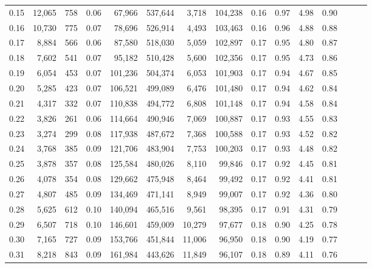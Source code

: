 \begin{tabular}{rrrrrrrrrrrrrrr}
0.15 &  12,065 &    758 &  0.06 &   67,966 &  537,644 &    3,718 &  104,238 &  0.16 &  0.97 &  4.98 &      0.90 \\
0.16 &  10,730 &    775 &  0.07 &   78,696 &  526,914 &    4,493 &  103,463 &  0.16 &  0.96 &  4.88 &      0.88 \\
0.17 &   8,884 &    566 &  0.06 &   87,580 &  518,030 &    5,059 &  102,897 &  0.17 &  0.95 &  4.80 &      0.87 \\
0.18 &   7,602 &    541 &  0.07 &   95,182 &  510,428 &    5,600 &  102,356 &  0.17 &  0.95 &  4.73 &      0.86 \\
0.19 &   6,054 &    453 &  0.07 &  101,236 &  504,374 &    6,053 &  101,903 &  0.17 &  0.94 &  4.67 &      0.85 \\
0.20 &   5,285 &    423 &  0.07 &  106,521 &  499,089 &    6,476 &  101,480 &  0.17 &  0.94 &  4.62 &      0.84 \\
0.21 &   4,317 &    332 &  0.07 &  110,838 &  494,772 &    6,808 &  101,148 &  0.17 &  0.94 &  4.58 &      0.84 \\
0.22 &   3,826 &    261 &  0.06 &  114,664 &  490,946 &    7,069 &  100,887 &  0.17 &  0.93 &  4.55 &      0.83 \\
0.23 &   3,274 &    299 &  0.08 &  117,938 &  487,672 &    7,368 &  100,588 &  0.17 &  0.93 &  4.52 &      0.82 \\
0.24 &   3,768 &    385 &  0.09 &  121,706 &  483,904 &    7,753 &  100,203 &  0.17 &  0.93 &  4.48 &      0.82 \\
0.25 &   3,878 &    357 &  0.08 &  125,584 &  480,026 &    8,110 &   99,846 &  0.17 &  0.92 &  4.45 &      0.81 \\
0.26 &   4,078 &    354 &  0.08 &  129,662 &  475,948 &    8,464 &   99,492 &  0.17 &  0.92 &  4.41 &      0.81 \\
0.27 &   4,807 &    485 &  0.09 &  134,469 &  471,141 &    8,949 &   99,007 &  0.17 &  0.92 &  4.36 &      0.80 \\
0.28 &   5,625 &    612 &  0.10 &  140,094 &  465,516 &    9,561 &   98,395 &  0.17 &  0.91 &  4.31 &      0.79 \\
0.29 &   6,507 &    718 &  0.10 &  146,601 &  459,009 &   10,279 &   97,677 &  0.18 &  0.90 &  4.25 &      0.78 \\
0.30 &   7,165 &    727 &  0.09 &  153,766 &  451,844 &   11,006 &   96,950 &  0.18 &  0.90 &  4.19 &      0.77 \\
0.31 &   8,218 &    843 &  0.09 &  161,984 &  443,626 &   11,849 &   96,107 &  0.18 &  0.89 &  4.11 &      0.76 \\

\end{tabular}
